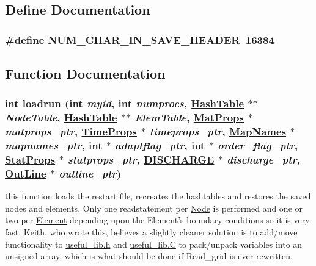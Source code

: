 \subsection{Define Documentation}
\hypertarget{restart_8C_a0}{
\subsubsection[NUM\_\-CHAR\_\-IN\_\-SAVE\_\-HEADER]{\setlength{\rightskip}{0pt plus 5cm}\#define NUM\_\-CHAR\_\-IN\_\-SAVE\_\-HEADER\ 16384}}
\label{restart_8C_a0}




\subsection{Function Documentation}
\hypertarget{restart_8C_a1}{
\subsubsection[loadrun]{\setlength{\rightskip}{0pt plus 5cm}int loadrun (int {\em myid}, int {\em numprocs}, \hyperlink{classHashTable}{Hash\-Table} $\ast$$\ast$ {\em Node\-Table}, \hyperlink{classHashTable}{Hash\-Table} $\ast$$\ast$ {\em Elem\-Table}, \hyperlink{structMatProps}{Mat\-Props} $\ast$ {\em matprops\_\-ptr}, \hyperlink{structTimeProps}{Time\-Props} $\ast$ {\em timeprops\_\-ptr}, \hyperlink{structMapNames}{Map\-Names} $\ast$ {\em mapnames\_\-ptr}, int $\ast$ {\em adaptflag\_\-ptr}, int $\ast$ {\em order\_\-flag\_\-ptr}, \hyperlink{structStatProps}{Stat\-Props} $\ast$ {\em statprops\_\-ptr}, \hyperlink{structDISCHARGE}{DISCHARGE} $\ast$ {\em discharge\_\-ptr}, \hyperlink{structOutLine}{Out\-Line} $\ast$ {\em outline\_\-ptr})}}
\label{restart_8C_a1}


this function loads the restart file, recreates the hashtables and restores the saved nodes and elements. Only one readstatement per \hyperlink{classNode}{Node} is performed and one or two per \hyperlink{classElement}{Element} depending upon the Element's boundary conditions so it is very fast. Keith, who wrote this, believes a slightly cleaner solution is to add/move functionality to \hyperlink{useful__lib_8h}{useful\_\-lib.h} and \hyperlink{constant_8h_a21}{useful\_\-lib.C} to pack/unpack variables into an unsigned array, which is what should be done if Read\_\-grid is ever rewritten. 

